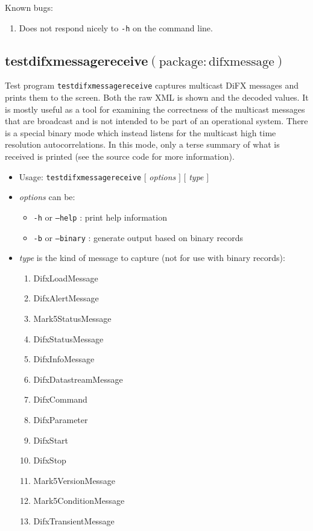 \noindent
Known bugs: 
\begin{enumerate}
\item Does not respond nicely to {\tt -h} on the command line.
\end{enumerate}






\subsection{testdifxmessagereceive{\small $\mathrm{(package: difxmessage)}$}} \label{sec:difxmessage}

Test program {\tt testdifxmessagereceive} captures multicast DiFX messages and prints them to the screen.
Both the raw XML is shown and the decoded values.
It is mostly useful as a tool for examining the correctness of the multicast messages that are broadcast and is not intended to be part of an operational system.
There is a special binary mode which instead listens for the multicast high time resolution autocorrelations.
In this mode, only a terse summary of what is received is printed (see the source code for more information).

\begin{itemize}
\item[] Usage: {\tt testdifxmessagereceive}  $[$ {\em options} $]$  $[$ {\em type} $]$
\item[] {\em options} can be:
\begin{itemize}
\item[] {\tt -h} or {\tt --help} : print help information
\item[] {\tt -b} or {\tt --binary} : generate output based on binary records
\end{itemize}
\item[] {\em type} is the kind of message to capture (not for use with binary records):
\begin{enumerate}
\item DifxLoadMessage
\item DifxAlertMessage
\item Mark5StatusMessage
\item DifxStatusMessage
\item DifxInfoMessage
\item DifxDatastreamMessage
\item DifxCommand
\item DifxParameter
\item DifxStart
\item DifxStop
\item Mark5VersionMessage
\item Mark5ConditionMessage
\item DifxTransientMessage
\end{enumerate}
\end{itemize}

